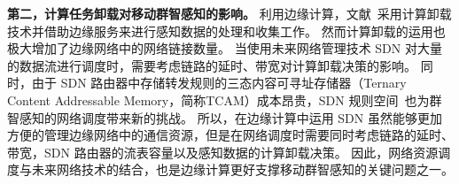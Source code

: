 
\textbf{第二，计算任务卸载对移动群智感知的影响。}
利用边缘计算，文献~采用计算卸载技术并借助边缘服务来进行感知数据的处理和收集工作。
然而计算卸载的运用也极大增加了边缘网络中的网络链接数量。
当使用未来网络管理技术 SDN 对大量的数据流进行调度时，需要考虑链路的延时、带宽对计算卸载决策的影响。
同时，由于 SDN 路由器中存储转发规则的三态内容可寻址存储器（Ternary Content Addressable Memory，简称TCAM）成本昂贵，SDN 规则空间~\cite{Katta:2014es}也为群智感知的网络调度带来新的挑战。
所以，在边缘计算中运用 SDN 虽然能够更加方便的管理边缘网络中的通信资源，但是在网络调度时需要同时考虑链路的延时、带宽，SDN 路由器的流表容量以及感知数据的计算卸载决策。
因此，网络资源调度与未来网络技术的结合，也是边缘计算更好支撑移动群智感知的关键问题之一。



